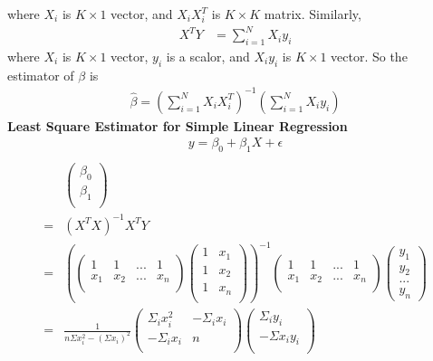 \documentclass[a4paper]{article}
\begin{document}
where $X_i$ is $K \times 1$ vector, and $X_i X_i^T$ is $K \times K $ matrix.
Similarly,
\begin{align*}
X^TY & = \sum_{i=1}^N X_i y_i
\end{align*}
where $X_i$ is $K \times 1$ vector, $y_i$ is a scalor, and $X_iy_i$ is $K \times 1$ vector.
So the estimator of $\beta$ is
\begin{align*}
\hat \beta = (\sum_{i=1}^N X_i X_i^T)^{-1} (\sum_{i=1}^N X_i y_i)
\end{align*}
{\bf Least Square Estimator for Simple Linear Regression}\\
\begin{align*}
y =  \beta_0 + \beta_1 X + \epsilon\\
\end{align*}
\begin{align*}
	&\left(  \begin{array} {c}
		\beta_{0} \\
		\beta_{1} \\
		\end{array}
		\right) \\
=& (X^TX)^{-1}X^TY \\
=&\left( \left(  \begin{array} {cccc}
		1 & 1 &... &1\\
		x_1 & x_2 &... &x_n \\
		\end{array}
		\right) 
    \left(  \begin{array} {cc}
		1 & x_1 \\
		1 & x_2 \\
                   1 & x_n \\
		\end{array}
		\right) 
\right)^{-1}
\left(  \begin{array} {cccc}
		1 & 1 &... &1\\
		x_1 & x_2 &... &x_n \\
		\end{array}
		\right) 
\left(  \begin{array} {c}
		y_1 \\
		y_2 \\
                  ... \\
                  y_n
		\end{array}
		\right) \\
=& \frac{1}{n\Sigma x^2_i - (\Sigma x_i)^2}
\left(  \begin{array} {cc}
	          \Sigma_i x_i^2 & -\Sigma_i x_i \\
		 -\Sigma_i x_i &n\\
		\end{array}
		\right) 
\left(  \begin{array} {c}
	          \Sigma_i y_i \\
		 -\Sigma x_i y_i\\
		\end{array}
		\right) 
\end{align*}
\end{document}
